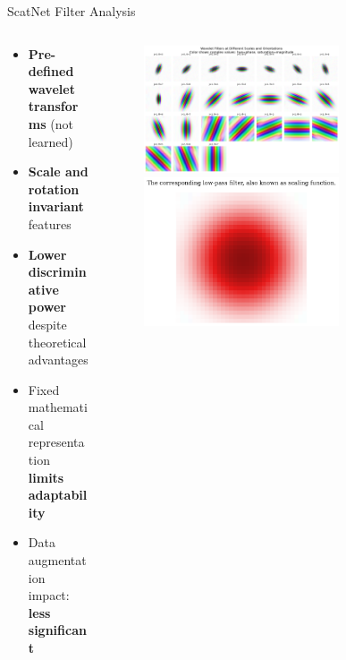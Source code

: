 \documentclass[aspectratio=169,8pt]{beamer}  %
\begin{document}
\begin{frame}{ScatNet Filter Analysis}
\begin{columns}[T]
\begin{column}{0.5\textwidth}
\begin{itemize}
\item \textbf{Pre-defined wavelet transforms} (not learned)
\item \textbf{Scale and rotation invariant} features
\item \textbf{Lower discriminative power} despite theoretical advantages
\item Fixed mathematical representation \textbf{limits adaptability}
\item Data augmentation impact: \textbf{less significant}
\end{itemize}
\end{column}
\begin{column}{0.5\textwidth}
\begin{figure}
\includegraphics[width=0.7\textwidth]{imgs/scatnet_filters.png}
\vspace{0.5cm}
\includegraphics[width=0.7\textwidth]{imgs/scatnet_low_pass.png}
\end{figure}
\end{column}
\end{columns}
\end{frame}
\end{document}
